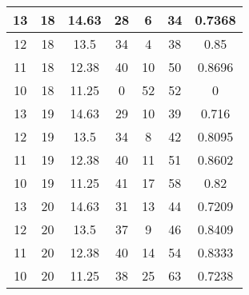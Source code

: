 \documentclass[letterpaper, 12pt]{article}
\begin{document}
\begin{longtable}{|c|c|c|c|c|c|c|}
\hline
13 & 18 & 14.63 & 28 & 6 & 34 & 0.7368 \\
\hline
12 & 18 & 13.5 & 34 & 4 & 38 & 0.85 \\
\hline
11 & 18 & 12.38 & 40 & 10 & 50 & 0.8696 \\
\hline
10 & 18 & 11.25 & 0 & 52 & 52 & 0 \\
\hline
13 & 19 & 14.63 & 29 & 10 & 39 & 0.716 \\
\hline
12 & 19 & 13.5 & 34 & 8 & 42 & 0.8095 \\
\hline
11 & 19 & 12.38 & 40 & 11 & 51 & 0.8602 \\
\hline
10 & 19 & 11.25 & 41 & 17 & 58 & 0.82 \\
\hline
13 & 20 & 14.63 & 31 & 13 & 44 & 0.7209 \\
\hline
12 & 20 & 13.5 & 37 & 9 & 46 & 0.8409 \\
\hline
11 & 20 & 12.38 & 40 & 14 & 54 & 0.8333 \\
\hline
10 & 20 & 11.25 & 38 & 25 & 63 & 0.7238 \\
\hline
\end{longtable}
\end{document}
